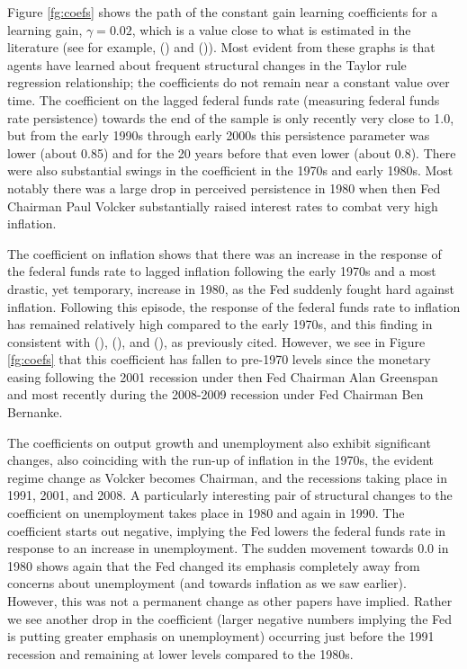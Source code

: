 \documentclass[12pt]{article}
\newcommand{\citee}[1]{\citename{#1} (\citeyear{#1})}
\begin{document}
Figure \ref{fg:coefs} shows the path of the constant gain learning coefficients for a learning gain, $\gamma=0.02$, which is a value close to what is estimated in the literature (see for example, \citee{milani2007} and \citee{slobodyan_wouters_2008}).  Most evident from these graphs is that agents have learned about frequent structural changes in the Taylor rule regression relationship; the coefficients do not remain near a constant value over time.  The coefficient on the lagged federal funds rate (measuring federal funds rate persistence) towards the end of the sample is only recently very close to 1.0, but from the early 1990s through early 2000s this persistence parameter was lower (about 0.85) and for the 20 years before that even lower (about 0.8).  There were also substantial swings in the coefficient in the 1970s and early 1980s.  Most notably there was a large drop in perceived persistence in 1980 when then Fed Chairman Paul Volcker substantially raised interest rates to combat very high inflation.  

The coefficient on inflation shows that there was an increase in the response of the federal funds rate to lagged inflation following the early 1970s and a most drastic, yet temporary, increase in 1980, as the Fed suddenly fought hard against inflation.  Following this episode, the response of the federal funds rate to inflation has remained relatively high compared to the early 1970s, and this finding in consistent with \citee{taylor1999}, \citee{cgg2000}, and \citee{orphanides2003}, as previously cited.  However, we see in Figure \ref{fg:coefs} that this coefficient has fallen to pre-1970 levels since the monetary easing following the 2001 recession under then Fed Chairman Alan Greenspan and most recently during the 2008-2009 recession under Fed Chairman Ben Bernanke.

The coefficients on output growth and unemployment also exhibit significant changes, also coinciding with the run-up of inflation in the 1970s, the evident regime change as Volcker becomes Chairman, and the recessions taking place in 1991, 2001, and 2008.  A particularly interesting pair of structural changes to the coefficient on unemployment takes place in 1980 and again in 1990.  The coefficient starts out negative, implying the Fed lowers the federal funds rate in response to an increase in unemployment.  The sudden movement towards 0.0 in 1980 shows again that the Fed changed its emphasis completely away from concerns about unemployment (and towards inflation as we saw earlier).  However, this was not a permanent change as other papers have implied.  Rather we see another drop in the coefficient (larger negative numbers implying the Fed is putting greater emphasis on unemployment) occurring just before the 1991 recession and remaining at lower levels compared to the 1980s.  
\end{document}
